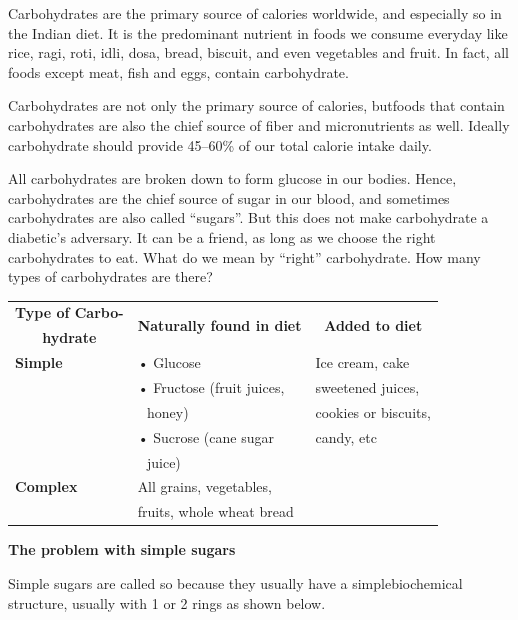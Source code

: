 Carbohydrates are the primary source of calories worldwide, and especially so in the Indian diet. It is the predominant nutrient in foods we consume everyday like rice, ragi, roti, idli, dosa, bread, biscuit, and even vegetables and fruit. In fact, all foods except meat, fish and eggs, contain carbohydrate.

Carbohydrates are not only the primary source of calories, but\break foods that contain carbohydrates are also the chief source of fiber and micronutrients as well. Ideally carbohydrate should provide 45–60\% of our total calorie intake daily.

All carbohydrates are broken down to form glucose in our bodies. Hence, carbohydrates are the chief source of sugar in our blood, and sometimes carbohydrates are also called “sugars”. But this does not make carbohydrate a diabetic’s adversary. It can be a friend, as long as we choose the right carbohydrates to eat. What do we mean by “right” carbohydrate. How many types of carbohydrates are there?

\begin{center}
\begin{tabular}{|l|l|l|}
\hline
\multicolumn{1}{|c}{\textbf{Type of Carbo-}} & \multicolumn{1}{|c}{\multirow{2}{4cm}{\textbf{Naturally found in diet}}} & \multicolumn{1}{|c|}{\multirow{2}{2.3cm}{\textbf{Added to diet}}}\\
\multicolumn{1}{|c|}{\textbf{hydrate}} & &\\
\hline
\textbf{Simple} & • Glucose & Ice cream, cake\\
\hline
 & • Fructose (fruit juices, & sweetened juices,\\
  & \,\, honey) & cookies or biscuits,\\
  & • Sucrose (cane sugar & candy, etc\\
  & \,\, juice) & \\
\hline
\textbf{Complex} & All grains, vegetables, &\\
 & fruits, whole wheat bread &\\
\hline
\end{tabular}
\end{center}

\noindent\textbf{The problem with simple sugars}

Simple sugars are called so because they usually have a simple\break biochemical structure, usually with 1 or 2 rings as shown below.

